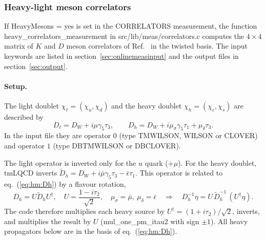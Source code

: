 \subsubsection{Heavy-light meson correlators}
\label{sec:heavymesons}

\providecommand{\id}{1\!\!1}
\providecommand{\Tr}{\operatorname{Tr}}
\providecommand{\vev}[1]{\left\langle #1 \right\rangle}
\begingroup\sloppy

If {\ttfamily HeavyMesons = yes} is set in the {\ttfamily CORRELATORS} measurement,
the function {\ttfamily heavy\_correlators\_measurement} in
{\ttfamily src/lib/meas/correlators.c} computes the $4\times4$ matrix of $K$ and $D$
meson correlators of Ref.~\cite{baron2011computing} in the twisted basis.
The input keywords are listed in section~\ref{sec:onlinemeasinput} and the output
files in section~\ref{sec:output}.

\paragraph{Setup.}
The light doublet $\chi_\ell=(\chi_u,\chi_d)$ and the heavy doublet $\chi_h=(\chi_c,\chi_s)$ are described by
\begin{equation}
  D_\ell = D_W + i\mu\gamma_5\tau_3 , \qquad
  D_h = D_W + i\mu_\sigma\gamma_5\tau_1 + \mu_\delta\tau_3 .
  \label{eq:hm:Dh}
\end{equation}
In the input file they are operator $0$ (type {\ttfamily TMWILSON}, {\ttfamily WILSON} or
{\ttfamily CLOVER}) and operator $1$ (type {\ttfamily DBTMWILSON} or {\ttfamily DBCLOVER}).

The light operator is inverted only for the $u$ quark ($+\mu$).
For the heavy doublet, tmLQCD inverts
$\tilde D_h = D_W + i\bar\mu\gamma_5\tau_3 - \bar\epsilon\tau_1$.
This operator is related to eq.~(\ref{eq:hm:Dh}) by a flavour rotation,
\begin{equation}
  D_h = U \tilde D_h U^\dagger , \quad U=\frac{1-i\tau_2}{\sqrt2} , \quad
  \mu_\sigma=\bar\mu ,\ \mu_\delta=\bar\epsilon
  \quad\Longrightarrow\quad
  D_h^{-1}\eta = U\,\tilde D_h^{-1}\,(U^\dagger\eta) .
\end{equation}
The code therefore multiplies each heavy source by $U^\dagger=(1+i\tau_2)/\sqrt2$, inverts,
and multiplies the result by $U$ ({\ttfamily mul\_one\_pm\_itau2} with sign $\pm1$).
All heavy propagators below are in the basis of eq.~(\ref{eq:hm:Dh}).

